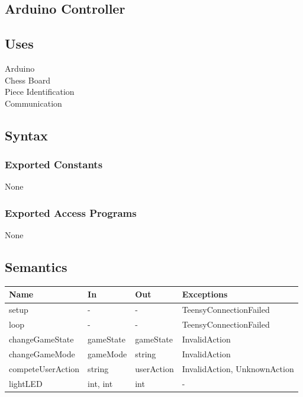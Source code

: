 \documentclass[12pt, titlepage]{article}
\begin{document}
\subsection{Arduino Controller}

\subsection{Uses}
Arduino\\
Chess Board\\
Piece Identification\\
Communication\\

\subsection{Syntax}

\subsubsection{Exported Constants}{
  None
}

\subsubsection{Exported Access Programs}
None

\subsection{Semantics}
{
  \begin{center}
  \begin{tabular}{p{4cm} p{3cm} p{3cm} p{4cm}}
  \hline
  \textbf{Name} & \textbf{In} & \textbf{Out} & \textbf{Exceptions} \\
  \hline
  setup & - & - & TeensyConnectionFailed \\
  \midrule
  loop & - & - & TeensyConnectionFailed \\
  \midrule
  changeGameState & gameState & gameState & InvalidAction \\
  \midrule
  changeGameMode & gameMode & string & InvalidAction \\
  \midrule
  competeUserAction & string & userAction & InvalidAction, UnknownAction \\
  \midrule
  lightLED & {int, int} & int & - \\
  \hline
  \end{tabular}
  \end{center}
}
\end{document}
